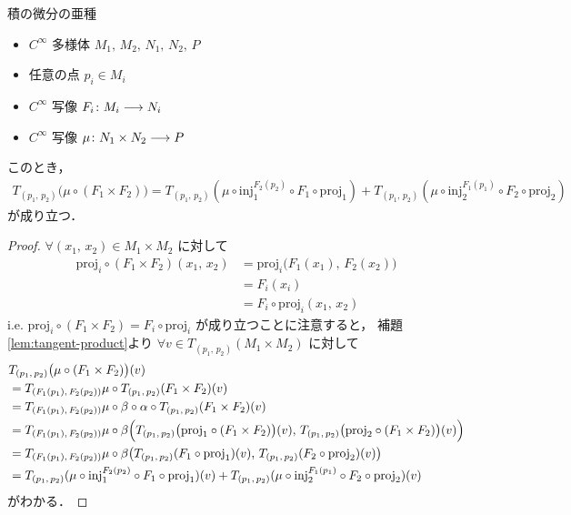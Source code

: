 \documentclass[geometry_main]{subfiles}
\begin{document}
\begin{mylem}[label=lem:diff-product]{積の微分の亜種}
    \begin{itemize}
        \item $C^\infty$ 多様体 $M_1,\, M_2,\, N_1,\, N_2,\, P$
        \item 任意の点 $p_i \in M_i$
        \item $C^\infty$ 写像 $F_i \colon M_i \longrightarrow N_i$
        \item $C^\infty$ 写像 $\mu \colon N_1 \times N_2 \longrightarrow P$
    \end{itemize}
    このとき，
    \begin{align}
        T_{(p_1,\, p_2)} \bigl( \mu \circ (F_1 \times F_2) \bigr) 
        = T_{(p_1,\, p_2)} (\mu \circ \mathrm{inj}_1^{F_2(p_2)} \circ F_1 \circ \mathrm{proj}_1) + T_{(p_1,\, p_2)} (\mu \circ \mathrm{inj}_2^{F_1(p_1)} \circ F_2 \circ \mathrm{proj}_2)
    \end{align}
    が成り立つ．
\end{mylem}

\begin{proof}
    $\forall (x_1,\, x_2) \in M_1 \times M_2$ に対して
    \begin{align}
        \mathrm{proj}_i \circ (F_1 \times F_2)(x_1,\, x_2) 
        &= \mathrm{proj}_i \bigl( F_1(x_1),\, F_2(x_2) \bigr) \\
        &= F_i(x_i) \\
        &= F_i \circ \mathrm{proj}_i (x_1,\, x_2)
    \end{align}
    i.e. $\mathrm{proj}_i \circ (F_1 \times F_2) = F_i \circ \mathrm{proj}_i$ が成り立つことに注意すると，
    補題\ref{lem:tangent-product}より $\forall v \in T_{(p_1,\, p_2)}(M_1 \times M_2)$ に対して
    \begin{align}
        &T_{(p_1,\, p_2)} \bigl( \mu \circ (F_1 \times F_2) \bigr)(v) \\
        &= T_{(F_1(p_1),\, F_2(p_2))} \mu \circ T_{(p_1,\, p_2)}(F_1 \times F_2)(v) \\
        &= T_{(F_1(p_1),\, F_2(p_2))} \mu \circ \beta \circ \alpha \circ T_{(p_1,\, p_2)}(F_1 \times F_2)(v) \\
        &= T_{(F_1(p_1),\, F_2(p_2))} \mu \circ \beta \Bigl(T_{(p_1,\, p_2)} \bigl(\mathrm{proj}_1 \circ (F_1 \times F_2)\bigr)(v) ,\, T_{(p_1,\, p_2)}\bigl(\mathrm{proj}_2 \circ (F_1 \times F_2)\bigr)(v) \Bigr) \\
        &= T_{(F_1(p_1),\, F_2(p_2))} \mu \circ \beta \bigl(T_{(p_1,\, p_2)} (F_1 \circ \mathrm{proj}_1)(v) ,\, T_{(p_1,\, p_2)}(F_2 \circ \mathrm{proj}_2)(v) \bigr) \\
        &= T_{(p_1,\, p_2)} (\mu \circ \mathrm{inj}_1^{F_2(p_2)} \circ F_1 \circ \mathrm{proj}_1)(v) + T_{(p_1,\, p_2)} (\mu \circ \mathrm{inj}_2^{F_1(p_1)} \circ F_2 \circ \mathrm{proj}_2)(v)
    \end{align}
    がわかる．
\end{proof}
\end{document}
